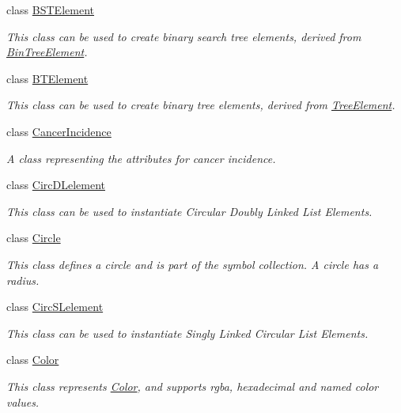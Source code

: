 \begin{DoxyCompactItemize}
class \mbox{\hyperlink{classbridges_1_1_b_s_t_element}{B\+S\+T\+Element}}
\begin{DoxyCompactList}\small\item\em This class can be used to create binary search tree elements, derived from \mbox{\hyperlink{classbridges_1_1_bin_tree_element}{Bin\+Tree\+Element}}. \end{DoxyCompactList}\item 
class \mbox{\hyperlink{classbridges_1_1_b_t_element}{B\+T\+Element}}
\begin{DoxyCompactList}\small\item\em This class can be used to create binary tree elements, derived from \mbox{\hyperlink{classbridges_1_1_tree_element}{Tree\+Element}}. \end{DoxyCompactList}\item 
class \mbox{\hyperlink{classbridges_1_1_cancer_incidence}{Cancer\+Incidence}}
\begin{DoxyCompactList}\small\item\em A class representing the attributes for cancer incidence. \end{DoxyCompactList}\item 
class \mbox{\hyperlink{classbridges_1_1_circ_d_lelement}{Circ\+D\+Lelement}}
\begin{DoxyCompactList}\small\item\em This class can be used to instantiate Circular Doubly Linked List Elements. \end{DoxyCompactList}\item 
class \mbox{\hyperlink{classbridges_1_1_circle}{Circle}}
\begin{DoxyCompactList}\small\item\em This class defines a circle and is part of the symbol collection. A circle has a radius. \end{DoxyCompactList}\item 
class \mbox{\hyperlink{classbridges_1_1_circ_s_lelement}{Circ\+S\+Lelement}}
\begin{DoxyCompactList}\small\item\em This class can be used to instantiate Singly Linked Circular List Elements. \end{DoxyCompactList}\item 
class \mbox{\hyperlink{classbridges_1_1_color}{Color}}
\begin{DoxyCompactList}\small\item\em This class represents \mbox{\hyperlink{classbridges_1_1_color}{Color}}, and supports rgba, hexadecimal and named color values. \end{DoxyCompactList}\item 

\end{DoxyCompactItemize}
